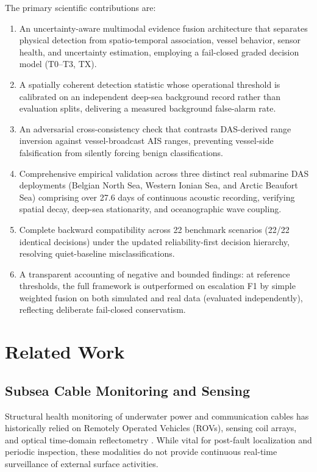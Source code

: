 \documentclass[conference]{IEEEtran}
\newcommand{\dstate}[1]{\ensuremath{\mathrm{#1}}}
\begin{document}
The primary scientific contributions are:
\begin{enumerate}
\item An uncertainty-aware multimodal evidence fusion architecture that
separates physical detection from spatio-temporal association, vessel behavior,
sensor health, and uncertainty estimation, employing a fail-closed graded
decision model (\dstate{T0}--\dstate{T3}, \dstate{TX}).
\item A spatially coherent detection statistic whose operational threshold is
calibrated on an independent deep-sea background record rather than evaluation
splits, delivering a measured background false-alarm rate.
\item An adversarial cross-consistency check that contrasts DAS-derived range
inversion against vessel-broadcast AIS ranges, preventing vessel-side
falsification from silently forcing benign classifications.
\item Comprehensive empirical validation across three distinct real submarine
DAS deployments (Belgian North Sea, Western Ionian Sea, and Arctic Beaufort
Sea) comprising over 27.6 days of continuous acoustic recording, verifying
spatial decay, deep-sea stationarity, and oceanographic wave coupling.
\item Complete backward compatibility across 22 benchmark scenarios (22/22
identical decisions) under the updated reliability-first decision hierarchy,
resolving quiet-baseline misclassifications.
\item A transparent accounting of negative and bounded findings: at reference
thresholds, the full framework is outperformed on escalation F1 by simple
weighted fusion on both simulated and real data (evaluated independently),
reflecting deliberate fail-closed conservatism.
\end{enumerate}

\section{Related Work}

\subsection{Subsea Cable Monitoring and Sensing}
Structural health monitoring of underwater power and communication cables has
historically relied on Remotely Operated Vehicles (ROVs), sensing coil arrays,
and optical time-domain reflectometry \cite{b1,b2,b3,b4}. While vital for
post-fault localization and periodic inspection, these modalities do not provide
continuous real-time surveillance of external surface activities.
\end{document}
